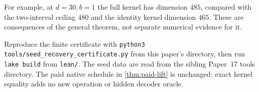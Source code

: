 For example, at $d=30,b=1$ the full kernel has dimension $485$,
compared with the two-interval ceiling $480$ and the identity kernel
dimension $465$. These are consequences of the general theorem, not
separate numerical evidence for it.

Reproduce the finite certificate with
\texttt{python3 tools/seed\_recovery\_certificate.py} from this paper's
directory, then run \texttt{lake build} from \texttt{lean/}.
The seed data are read from the sibling Paper~17 tools directory.
The paid native schedule in \cref{thm:paid-lift} is unchanged: exact
kernel equality adds no new operation or hidden decoder oracle.
